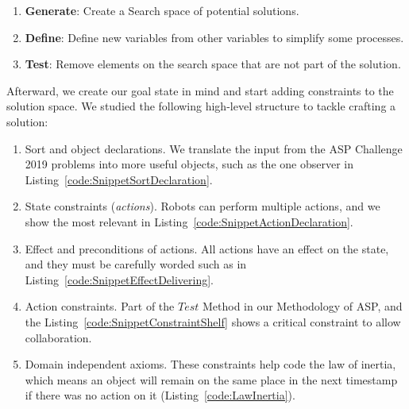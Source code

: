 \documentclass{IEEEtran}
\begin{document}
\begin{enumerate}
  \item \textbf{Generate}: Create a Search space of potential solutions.
  \item \textbf{Define}: Define new variables from other variables to simplify some processes.
  \item \textbf{Test}: Remove elements on the search space that are not part of the solution.
\end{enumerate}

Afterward, we create our goal state in mind and start adding constraints to the solution space. We studied the following high-level structure to tackle crafting a solution:

\begin{enumerate}
  \item Sort and object declarations. We translate the input from the ASP Challenge 2019 problems into more useful objects, such as the one observer in Listing~\ref{code:SnippetSortDeclaration}.
  
  \item State constraints (\textit{actions}). Robots can perform multiple actions, and we show the most relevant in Listing~\ref{code:SnippetActionDeclaration}.
  
  \item Effect and preconditions of actions. All actions have an effect on the state, and they must be carefully worded such as in Listing~\ref{code:SnippetEffectDelivering}.
  
  \item Action constraints. Part of the $Test$ Method in our Methodology of ASP, and the Listing~\ref{code:SnippetConstraintShelf} shows a critical constraint to allow collaboration.
  
  \item Domain independent axioms. These constraints help code the law of inertia, which means an object will remain on the same place in the next timestamp if there was no action on it (Listing~\ref{code:LawInertia}).
  
\end{enumerate}
\end{document}
